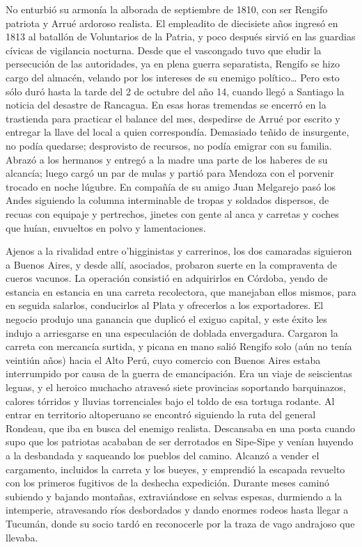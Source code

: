 \documentclass[10pt,twoside,openright]{memoir}
\begin{document}
No enturbió su armonía la alborada de septiembre de 1810, con ser
Rengifo patriota y Arrué ardoroso realista. El empleadito de diecisiete
años ingresó en 1813 al batallón de Voluntarios de la Patria, y poco
después sirvió en las guardias cívicas de vigilancia nocturna. Desde que
el vascongado tuvo que eludir la persecución de las autoridades, ya en
plena guerra separatista, Rengifo se hizo cargo del almacén, velando por
los intereses de su enemigo político\ldots{} Pero esto sólo duró hasta
la tarde del 2 de octubre del año 14, cuando llegó a Santiago la noticia
del desastre de Rancagua. En esas horas tremendas se encerró en la
trastienda para practicar el balance del mes, despedirse de Arrué por
escrito y entregar la llave del local a quien correspondía. Demasiado
teñido de insurgente, no podía quedarse; desprovisto de recursos, no
podía emigrar con su familia. Abrazó a los hermanos y entregó a la madre
una parte de los haberes de su alcancía; luego cargó un par de mulas y
partió para Mendoza con el porvenir trocado en noche lúgubre. En
compañía de su amigo Juan Melgarejo pasó los Andes siguiendo la columna
interminable de tropas y soldados dispersos, de recuas con equipaje y
pertrechos, jinetes con gente al anca y carretas y coches que huían,
envueltos en polvo y lamentaciones.

Ajenos a la rivalidad entre o'higginistas y carrerinos, los dos
camaradas siguieron a Buenos Aires, y desde allí, asociados, probaron
suerte en la compraventa de cueros vacunos. La operación consistió en
adquirirlos en Córdoba, yendo de estancia en estancia en una carreta
recolectora, que manejaban ellos mismos, para en seguida salarlos,
conducirlos al Plata y ofrecerlos a los exportadores. El negocio produjo
una ganancia que duplicó el exiguo capital, y este éxito les indujo a
arriesgarse en una especulación de doblada envergadura. Cargaron la
carreta con mercancía surtida, y picana en mano salió Rengifo solo (aún
no tenía veintiún años) hacia el Alto Perú, cuyo comercio con Buenos
Aires estaba interrumpido por causa de la guerra de emancipación. Era un
viaje de seiscientas leguas, y el heroico muchacho atravesó siete
provincias soportando barquinazos, calores tórridos y lluvias
torrenciales bajo el toldo de esa tortuga rodante. Al entrar en
territorio altoperuano se encontró siguiendo la ruta del general
Rondeau, que iba en busca del enemigo realista. Descansaba en una posta
cuando supo que los patriotas acababan de ser derrotados en Sipe-Sipe y
venían huyendo a la desbandada y saqueando los pueblos del camino.
Alcanzó a vender el cargamento, incluidos la carreta y los bueyes, y
emprendió la escapada revuelto con los primeros fugitivos de la deshecha
expedición. Durante meses caminó subiendo y bajando montañas,
extraviándose en selvas espesas, durmiendo a la intemperie, atravesando
ríos desbordados y dando enormes rodeos hasta llegar a Tucumán, donde su
socio tardó en reconocerle por la traza de vago andrajoso que llevaba.
\end{document}

